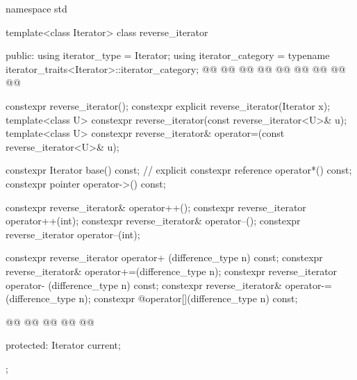 %
\begin{codeblock}
namespace std {
  template<class Iterator>
  class reverse_iterator {
  public:
    using iterator_type     = Iterator;
    using iterator_category = typename iterator_traits<Iterator>::iterator_category;
    @@
    @@
    @@
    @@
    @@
    @@
    @@
    @@
    @@

    constexpr reverse_iterator();
    constexpr explicit reverse_iterator(Iterator x);
    template<class U> constexpr reverse_iterator(const reverse_iterator<U>& u);
    template<class U> constexpr reverse_iterator& operator=(const reverse_iterator<U>& u);

    constexpr Iterator base() const;      // explicit
    constexpr reference operator*() const;
    constexpr pointer   operator->() const;

    constexpr reverse_iterator& operator++();
    constexpr reverse_iterator  operator++(int);
    constexpr reverse_iterator& operator--();
    constexpr reverse_iterator  operator--(int);

    constexpr reverse_iterator  operator+ (difference_type n) const;
    constexpr reverse_iterator& operator+=(difference_type n);
    constexpr reverse_iterator  operator- (difference_type n) const;
    constexpr reverse_iterator& operator-=(difference_type n);
    constexpr @\unspec@ operator[](difference_type n) const;

    @@
      @@
    @@
      @@
        @@

  protected:
    Iterator current;
  };

}
\end{codeblock}
